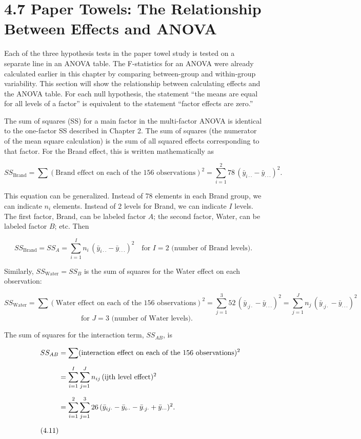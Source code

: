 \documentclass[
]{report}
\begin{document}
\chapter{4.7 Paper Towels: The Relationship Between Effects and ANOVA}\label{paper-towels-the-relationship-between-effects-and-anova}

Each of the three hypothesis tests in the paper towel study is tested on a separate line in an ANOVA table. The F-statistics for an ANOVA were already calculated earlier in this chapter by comparing between-group and within-group variability. This section will show the relationship between calculating effects and the ANOVA table. For each null hypothesis, the statement ``the means are equal for all levels of a factor'' is equivalent to the statement ``factor effects are zero.''

The sum of squares (SS) for a main factor in the multi-factor ANOVA is identical to the one-factor SS described in Chapter 2. The sum of squares (the numerator of the mean square calculation) is the sum of all squared effects corresponding to that factor. For the Brand effect, this is written mathematically as

\[
SS_{\text{Brand}}
= \sum (\text{Brand effect on each of the 156 observations})^2
= \sum_{i=1}^{2} 78\,(\bar y_{i\cdot\cdot} - \bar y_{\cdot\cdot\cdot})^2.
\tag{4.9}
\]

This equation can be generalized. Instead of 78 elements in each Brand group, we can indicate \(n_i\) elements. Instead of 2 levels for Brand, we can indicate \(I\) levels. The first factor, Brand, can be labeled factor \(A\); the second factor, Water, can be labeled factor \(B\); etc. Then

\[
SS_{\text{Brand}} = SS_A = \sum_{i=1}^{I} n_i \,(\bar y_{i\cdot\cdot} - \bar y_{\cdot\cdot\cdot})^2
\quad\text{for } I = 2 \text{ (number of Brand levels)}.
\]

Similarly, \(SS_{\text{Water}} = SS_B\) is the sum of squares for the Water effect on each observation:

\[
SS_{\text{Water}}
= \sum (\text{Water effect on each of the 156 observations})^2
= \sum_{j=1}^{3} 52\,(\bar y_{\cdot j \cdot} - \bar y_{\cdot\cdot\cdot})^2
= \sum_{j=1}^{J} n_j \,(\bar y_{\cdot j \cdot} - \bar y_{\cdot\cdot\cdot})^2
\]
\[
\quad\text{for } J = 3 \text{ (number of Water levels)}.
\tag{4.10}
\]

The sum of squares for the interaction term, \(SS_{AB}\), is

\begin{align}
SS_{AB} \notag
  &= \sum (\text{interaction effect on each of the 156 observations})^2 \\[6pt] \notag
  &= \sum_{i=1}^{I}\sum_{j=1}^{J} n_{ij}\,(\text{ijth level effect})^2 \\[6pt] \notag
  &= \sum_{i=1}^{2}\sum_{j=1}^{3} 26\,(\bar y_{ij\cdot} - \bar y_{i\cdot\cdot} - \bar y_{\cdot j \cdot} + \bar y_{\cdot\cdot\cdot})^2. \\[6pt] \tag{4.11}
\end{align}
\end{document}
